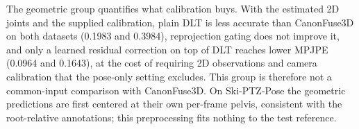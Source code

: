 \documentclass[preprint,12pt]{elsarticle}
\providecommand{\DIFaddbegin}{} %
\providecommand{\DIFaddend}{} %
\providecommand{\DIFadd}[1]{{\protect\color{blue}#1}} %
\begin{document}
 \DIFaddbegin \DIFadd{The geometric group quantifies what calibration buys. With the estimated 2D joints and the supplied calibration, plain DLT is less accurate than }\DIFaddend CanonFuse3D  \DIFaddbegin \DIFadd{on both datasets (0.1983 and 0.3984), reprojection gating does not improve it, and only a learned residual correction on top of DLT reaches lower MPJPE (0.0964 and 0.1643), at the cost of requiring 2D observations and camera calibration that the }\DIFaddend pose-only  \DIFaddbegin \DIFadd{setting excludes. This group is therefore not a common-input comparison with CanonFuse3D. On Ski-PTZ-Pose the geometric predictions are first centered at their own per-frame pelvis, consistent with the root-relative annotations; this preprocessing fits nothing to the test reference}\DIFaddend .
\end{document}
